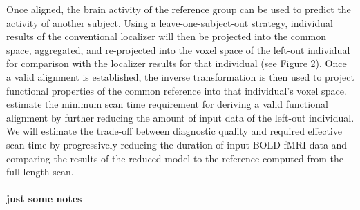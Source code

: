%
Once aligned, the brain activity of the reference group can be used to predict
the activity of another subject.
%
Using a leave-one-subject-out strategy, individual results of the conventional
localizer will then be projected into the common space, aggregated, and
re-projected into the voxel space of the left-out individual for comparison with
the localizer results for that individual (see Figure 2).
%
Once a valid alignment is established, the inverse transformation is then used
to project functional properties of the common reference into that individual's
voxel space.
%
estimate the minimum scan time requirement for deriving a valid functional
alignment by further reducing the amount of input data of the left-out
individual.
%
We will estimate the trade-off between diagnostic quality and required effective
scan time by progressively reducing the duration of input BOLD fMRI data and
comparing the results of the reduced model to the reference computed from the
full length scan.


\paragraph{just some notes}


